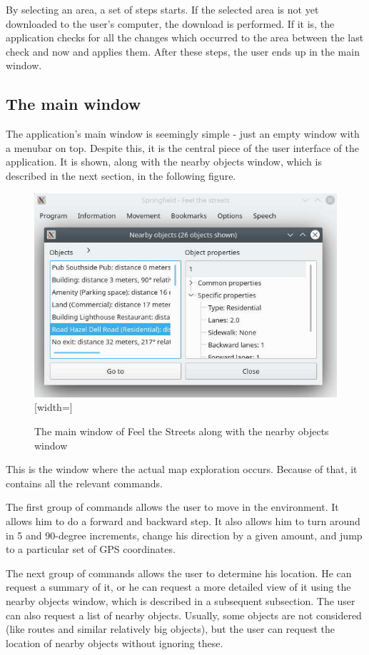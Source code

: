 \documentclass[nolof,digital]{fithesis3}
\begin{document}
By selecting an area, a set of steps starts. If the selected area is not yet downloaded to the user's computer, the download is performed. If it is, the application checks for all the changes which occurred to the area between the last check and now and applies them. After these steps, the user ends up in the main window.
\subsection{The main window}

The application's main window is seemingly simple - just an empty window with a menubar on top. Despite this, it is the central piece of the user interface of the application. It is shown, along with the nearby objects window, which is described in the next section, in the following figure.
\begin{figure}[h]
\caption{The main window of Feel the Streets along with the nearby objects window}
\includegraphics{feel-the-streets}[width=\textwidth]
\label{fig:fts}
\end{figure}

This is the window where the actual map exploration occurs. Because of that, it contains all the relevant commands.

The first group of commands allows the user to move in the environment. It allows him to do a forward and backward step. It also allows him to turn around in 5 and 90-degree increments, change his direction by a given amount, and jump to a particular set of GPS coordinates.

The next group of commands allows the user to determine his location. He can request a summary of it, or he can request a more detailed view of it using the nearby objects window, which is described in a subsequent subsection. The user can also request a list of nearby objects. Usually, some objects are not considered (like routes and similar relatively big objects), but the user can request the location of nearby objects without ignoring these.
\end{document}
